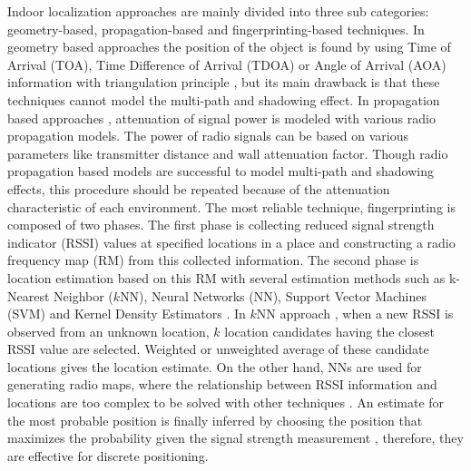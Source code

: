 \documentclass{article}
\begin{document}
	Indoor localization approaches are mainly divided into three sub categories: geometry-based, propagation-based and fingerprinting-based techniques. In geometry based approaches the position of the object is found by using Time of Arrival (TOA), Time Difference of Arrival (TDOA) or Angle of Arrival (AOA) information with triangulation principle \cite{Fan1990,Pet1998}, but its main drawback is that these techniques cannot model the multi-path and shadowing effect. In propagation based approaches \cite{bah2000}, attenuation of signal power is modeled with various radio propagation models. The power of radio signals can be based on various parameters like transmitter distance and wall attenuation factor. Though radio propagation based models are successful to model multi-path and shadowing effects, this procedure should be repeated because of the attenuation characteristic of each environment. The most reliable technique, fingerprinting is composed of two phases. The first phase is collecting reduced signal strength indicator (RSSI) values at specified locations in a place and constructing a radio frequency map (RM) from this collected information. The second phase is location estimation based on this RM with several estimation methods such as k-Nearest Neighbor ($k$NN), Neural Networks (NN), Support Vector Machines (SVM) and Kernel Density Estimators \cite{Roo2002}. In $k$NN approach \cite{bah2000,Big2017}, when a new RSSI is observed from an unknown location, $k$ location candidates having the closest RSSI value are selected. Weighted or unweighted average of these candidate locations gives the location estimate. On the other hand, NNs are used for generating radio maps, where the relationship between RSSI information and locations are too complex to be solved with other techniques \cite{Lyu2011,Maz2015,Sol2016,Zho2017}. An estimate for the most probable position is finally inferred by choosing the position that maximizes the probability given the signal strength measurement \cite{Fas2016}, therefore, they are effective for discrete positioning. 
	
\end{document}
